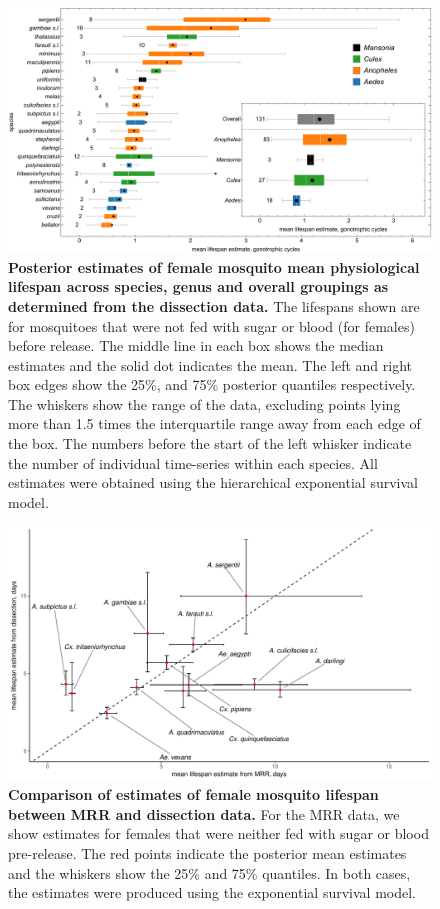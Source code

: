 \documentclass[12pt]{article}
\begin{document}
\begin{figure}[h]
	\centerline{\includegraphics[width=1\textwidth]{./Figure_files/dissection_lifetimes_exponential.pdf}}
	\caption{\textbf{Posterior estimates of female mosquito mean physiological lifespan across species, genus and overall groupings as determined from the dissection data.} The lifespans shown are for mosquitoes that were not fed with sugar or blood (for females) before release. The middle line in each box shows the median estimates and the solid dot indicates the mean. The left and right box edges show the 25\%, and 75\% posterior quantiles respectively. The whiskers show the range of the data, excluding points lying more than 1.5 times the interquartile range away from each edge of the box. The numbers before the start of the left whisker indicate the number of individual time-series within each species. All estimates were obtained using the hierarchical exponential survival model.}
	\label{fig:dissection_lifetimes_exponential}
\end{figure}

\begin{figure}[h]
	\centerline{\includegraphics[width=1.3\textwidth]{./Figure_files/comparison.pdf}}
	\caption{\textbf{Comparison of estimates of female mosquito lifespan between MRR and dissection data.} For the MRR data, we show estimates for females that were neither fed with sugar or blood pre-release. The red points indicate the posterior mean estimates and the whiskers show the 25\% and 75\% quantiles. In both cases, the estimates were produced using the exponential survival model.}
	\label{fig:comparison}
\end{figure}
\end{document}
